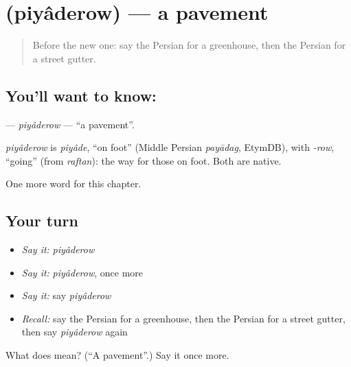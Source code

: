 \section[\texorpdfstring{\fa{پیاده} \fa{رو} (piyâderow)}{پیاده رو (piyâderow)}]{  (piyâderow) — a pavement}

\label{lesson:FA-C268-piyaderow}



\begin{quote}
Before the new one: say the Persian for a greenhouse, then the Persian for a street gutter.
\end{quote}

\subsection*{You'll want to know:  }
\textbf{ } — \emph{piyâderow} — \textquotedblleft{}a pavement\textquotedblright{}.

\begin{cousinweb}
\emph{piyâderow} is \emph{piyâde}, \textquotedblleft{}on foot\textquotedblright{} (Middle Persian \emph{payādag}, EtymDB), with \emph{-row}, \textquotedblleft{}going\textquotedblright{} (from \emph{raftan}): the way for those on foot. Both are native.
\end{cousinweb}

\begin{grammarlens}[title={What you've built}]
One more word for this chapter.
\end{grammarlens}

\subsection*{Your turn}
\begin{itemize}
\raggedright
  \item \emph{Say it:} \emph{piyâderow}
  \item \emph{Say it:} \emph{piyâderow}, once more
  \item \emph{Say it:} say \emph{piyâderow}
  \item \emph{Recall:} say the Persian for a greenhouse, then the Persian for a street gutter, then say \emph{piyâderow} again
\end{itemize}

\begin{tcolorbox}[breakable,colback=teal!4,colframe=teal!35!black,title={Before you move on}]
What does   mean? (\textquotedblleft{}A pavement\textquotedblright{}.) Say it once more.
\end{tcolorbox}
